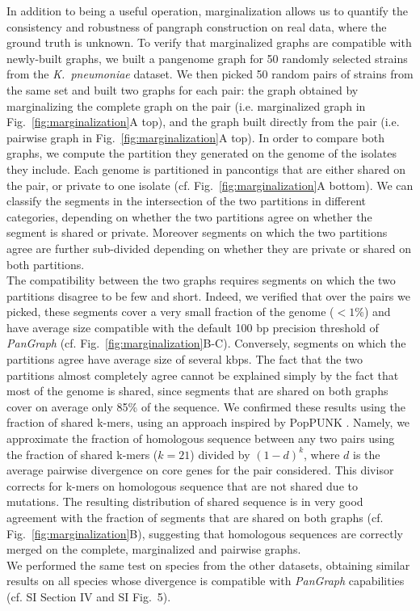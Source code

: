 \documentclass[aps,rmp,reprint,superscriptaddress,notitlepage,10pt]{revtex4-1}
\begin{document}
In addition to being a useful operation, marginalization allows us to quantify the consistency and robustness of pangraph construction on real data, where the ground truth is unknown.
To verify that marginalized graphs are compatible with newly-built graphs, we built a pangenome graph for 50 randomly selected strains from the \textit{K.~pneumoniae} dataset. We then picked 50 random pairs of strains from the same set and built two graphs for each pair: the graph obtained by marginalizing the complete graph on the pair (i.e. marginalized graph in Fig.~\ref{fig:marginalization}A top), and the graph built directly from the pair (i.e. pairwise graph in Fig.~\ref{fig:marginalization}A top).
In order to compare both graphs, we compute the partition they generated on the genome of the isolates they include. Each genome is partitioned in pancontigs that are either shared on the pair, or private to one isolate (cf. Fig.~\ref{fig:marginalization}A bottom). We can classify the segments in the intersection of the two partitions in different categories, depending on whether the two partitions agree on whether the segment is shared or private. Moreover segments on which the two partitions agree are further sub-divided depending on whether they are private or shared on both partitions.\\
The compatibility between the two graphs requires segments on which the two partitions disagree to be few and short. Indeed, we verified that over the pairs we picked, these segments cover a very small fraction of the genome ($<1\%$) and have average size compatible with the default 100 bp precision threshold of \textit{PanGraph} (cf. Fig.~\ref{fig:marginalization}B-C). Conversely, segments on which the partitions agree have average size of several kbps. The fact that the two partitions almost completely agree cannot be explained simply by the fact that most of the genome is shared, since segments that are shared on both graphs cover on average only 85\% of the sequence. We confirmed these results using the fraction of shared k-mers, using an approach inspired by PopPUNK \cite{lees2019fast}. Namely, we approximate the fraction of homologous sequence between any two pairs using the fraction of shared k-mers ($k=21$) divided by $(1-d)^{k}$, where $d$ is the average pairwise divergence on core genes for the pair considered. This divisor corrects for k-mers on homologous sequence that are not shared due to mutations. The resulting distribution of shared sequence is in very good agreement with the fraction of segments that are shared on both graphs (cf. Fig.~\ref{fig:marginalization}B), suggesting that homologous sequences are correctly merged on the complete, marginalized and pairwise graphs.\\
We performed the same test on species from the other datasets, obtaining similar results on all species whose divergence is compatible with \textit{PanGraph} capabilities (cf. SI Section IV and SI Fig.~5).
\end{document}

